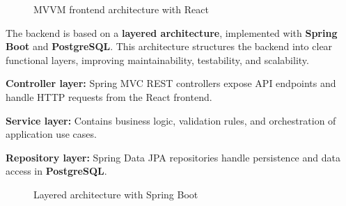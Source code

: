 \begin{figure}[H]
\centering
{}
\caption{MVVM frontend architecture with React}
\end{figure}

\vspace{6pt}


{\fontsize{12}{18}\selectfont
\setlength{\parindent}{1.2cm}
\setlength{\parskip}{6pt}

\indent The backend is based on a \textbf{layered architecture}, implemented with \textbf{Spring Boot} and \textbf{PostgreSQL}. This architecture structures the backend into clear functional layers, improving maintainability, testability, and scalability. \cite{spring_boot_docs,postgresql_docs}

\begin{itemize}[leftmargin=2cm, itemsep=4pt]
  {\fontsize{12}{18}\selectfont
  \item \textbf{Controller layer:} Spring MVC REST controllers expose API endpoints and handle HTTP requests from the React frontend.
  \item \textbf{Service layer:} Contains business logic, validation rules, and orchestration of application use cases.
  \item \textbf{Repository layer:} Spring Data JPA repositories handle persistence and data access in \textbf{PostgreSQL}.
  }
\end{itemize}

}

\begin{figure}[H]
\centering
{}
\caption{Layered architecture with Spring Boot}
\end{figure}

\vspace{6pt}


